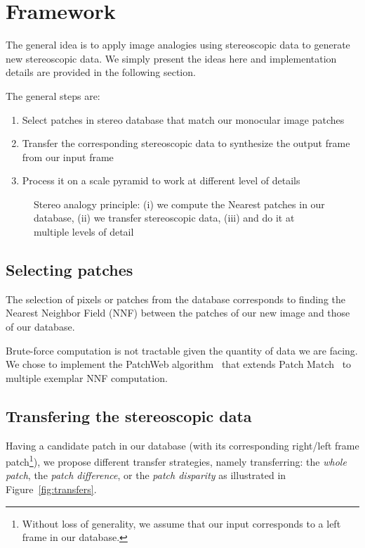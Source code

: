 
\section{Framework}

The general idea is to apply image analogies using stereoscopic data to generate new stereoscopic data.
We simply present the ideas here and implementation details are provided in the following section.

The general steps are:
\begin{enumerate}
	\item Select patches in stereo database that match our monocular image patches
	\item Transfer the corresponding stereoscopic data to synthesize the output frame from our input frame
	\item Process it on a scale pyramid to work at different level of details
\end{enumerate}

\begin{figure}
	\centering
	\caption{Stereo analogy principle: (i) we compute the Nearest patches in our database, (ii) we transfer stereoscopic data, (iii) and do it at multiple levels of detail}
\end{figure}

\subsection{Selecting patches}
The selection of pixels or patches from the database corresponds to finding the Nearest Neighbor Field (NNF) between the patches of our new image and those of our database.

Brute-force computation is not tractable given the quantity of data we are facing.
We chose to implement the PatchWeb algorithm~\cite{Barnes11} that extends Patch Match~\cite{Barnes09} to multiple exemplar NNF computation.

\subsection{Transfering the stereoscopic data}
Having a candidate patch in our database (with its corresponding right/left frame patch\footnote{Without loss of generality, we assume that our input corresponds to a left frame in our database.}), we propose different transfer strategies, namely transferring: the \emph{whole patch}, the \emph{patch difference}, or the \emph{patch disparity} as illustrated in Figure~\ref{fig:transfers}.

